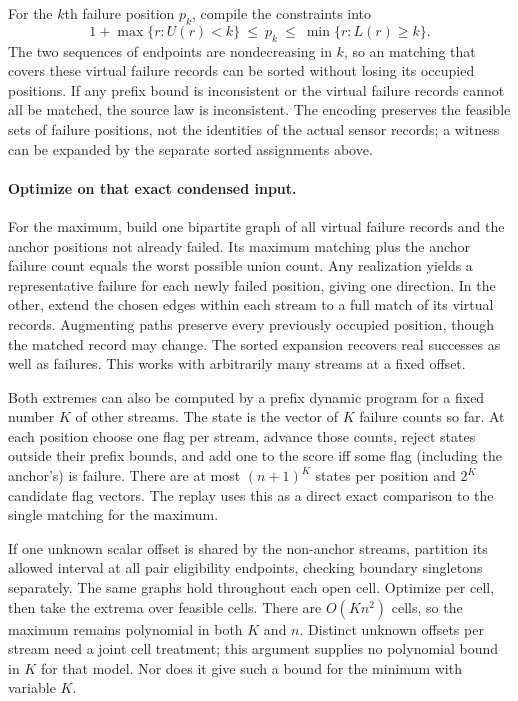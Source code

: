\documentclass[11pt]{article}
\begin{document}
For the \(k\)th failure position \(p_k\), compile the constraints into
\[
  1+\max\{r:U(r)<k\}\ \le\ p_k\ \le\
      \min\{r:L(r)\ge k\}.
\]
The two sequences of endpoints are nondecreasing in \(k\), so an
matching that covers these virtual failure records can be
sorted without losing its occupied positions. If any prefix bound
is inconsistent or the virtual failure records cannot all be
matched, the source law is inconsistent. The encoding preserves
the feasible sets of failure positions, not the identities of the
actual sensor records; a witness can be expanded by the separate
sorted assignments above.

\paragraph{Optimize on that exact condensed input.}
For the maximum, build one bipartite graph of all virtual failure
records and the anchor positions not already failed. Its maximum
matching plus the anchor failure count equals the worst possible
union count. Any realization yields a representative failure for
each newly failed position, giving one direction. In the other,
extend the chosen edges within each stream to a full match of its
virtual records. Augmenting paths preserve every previously
occupied position, though the matched record may change.
The sorted expansion recovers real successes as well as failures.
This works with arbitrarily many streams at a fixed offset.

Both extremes can also be computed by a prefix dynamic program
for a fixed number \(K\) of other streams. The state is the
vector of \(K\) failure counts so far. At each position choose
one flag per stream, advance those counts, reject states outside
their prefix bounds, and add one to the score iff some flag
(including the anchor's) is failure. There are at most
\((n+1)^K\) states per position and \(2^K\) candidate flag vectors.
The replay uses this as a direct exact comparison to the single
matching for the maximum.

If one unknown scalar offset is shared by the non-anchor streams,
partition its allowed interval at all pair eligibility endpoints,
checking boundary singletons separately. The same graphs hold
throughout each open cell. Optimize per cell, then take the
extrema over feasible cells. There are \(O(Kn^2)\) cells, so the
maximum remains polynomial in both \(K\) and \(n\). Distinct
unknown offsets per stream need a joint cell treatment; this
argument supplies no polynomial bound in \(K\) for that model.
Nor does it give such a bound for the minimum with variable \(K\).
\end{document}
